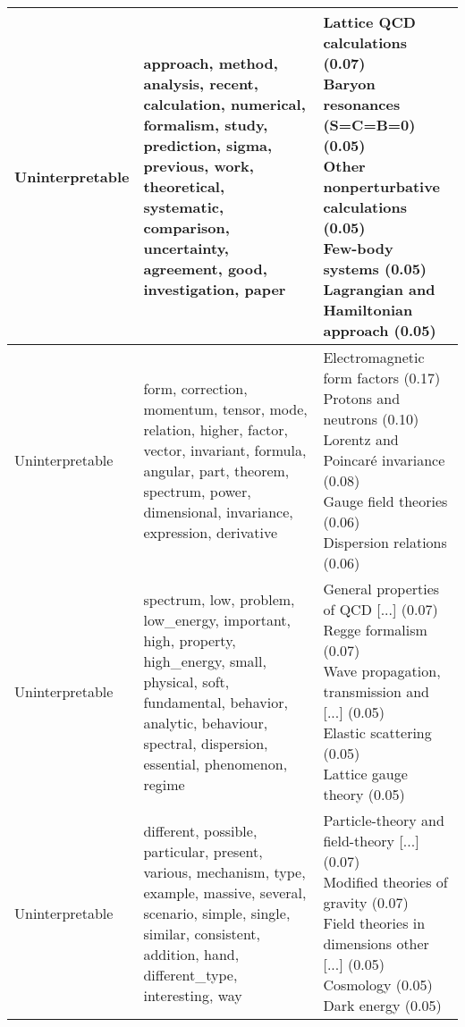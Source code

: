 \begin{longtable}{p{}|b{}|b{}}
                  Uninterpretable &                                                 approach, method, analysis, recent, calculation, numerical, formalism, study, prediction, sigma, previous, work, theoretical, systematic, comparison, uncertainty, agreement, good, investigation, paper &                                                \shortstack[l]{Lattice QCD calculations (0.07)\\ Baryon resonances (S=C=B=0) (0.05)\\ Other nonperturbative calculations (0.05)\\ Few-body systems (0.05)\\ Lagrangian and Hamiltonian approach (0.05)}\\ \hline
                  Uninterpretable &                                                                 form, correction, momentum, tensor, mode, relation, higher, factor, vector, invariant, formula, angular, part, theorem, spectrum, power, dimensional, invariance, expression, derivative &                                                                 \shortstack[l]{Electromagnetic form factors (0.17)\\ Protons and neutrons (0.10)\\ Lorentz and Poincaré invariance (0.08)\\ Gauge field theories (0.06)\\ Dispersion relations (0.06)}\\ \hline
                  Uninterpretable &                                                     spectrum, low, problem, low\_energy, important, high, property, high\_energy, small, physical, soft, fundamental, behavior, analytic, behaviour, spectral, dispersion, essential, phenomenon, regime &                                                            \shortstack[l]{General properties of QCD [...] (0.07)\\ Regge formalism (0.07)\\ Wave propagation, transmission and [...] (0.05)\\ Elastic scattering (0.05)\\ Lattice gauge theory (0.05)}\\ \hline
                  Uninterpretable &                                                          different, possible, particular, present, various, mechanism, type, example, massive, several, scenario, simple, single, similar, consistent, addition, hand, different\_type, interesting, way &                                                          \shortstack[l]{Particle-theory and field-theory [...] (0.07)\\ Modified theories of gravity (0.07)\\ Field theories in dimensions other [...] (0.05)\\ Cosmology (0.05)\\ Dark energy (0.05)}\\ \hline
\end{longtable}
